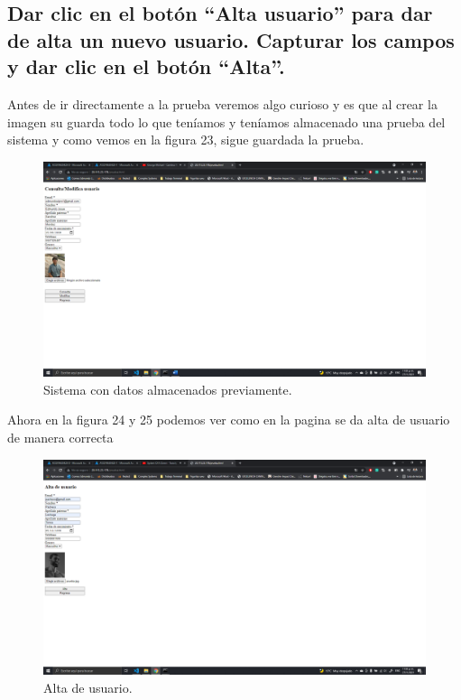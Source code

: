 \documentclass[11pt]{article}
\begin{document}
		\subsection{Dar clic en el botón ``Alta usuario'' para dar de alta un nuevo usuario. Capturar los campos y dar clic en el botón ``Alta''.}
		Antes de ir directamente a la prueba veremos algo curioso y es que al crear la imagen su guarda todo lo que teníamos y teníamos almacenado una prueba del sistema y como vemos en la figura 23, sigue guardada la prueba.
		\begin{figure}[H]
			\centering
			\includegraphics[scale=0.34]{resources/previo.png}
			\caption{Sistema con datos almacenados previamente.}\label{fig:picture}
		\end{figure}
		Ahora en la figura 24 y 25 podemos ver como en la pagina se da alta de usuario de manera correcta
		\begin{figure}[H]
			\centering
			\includegraphics[scale=0.34]{resources/p9.2.png}
			\caption{Alta de usuario.}\label{fig:picture}
		\end{figure}	
\end{document}
